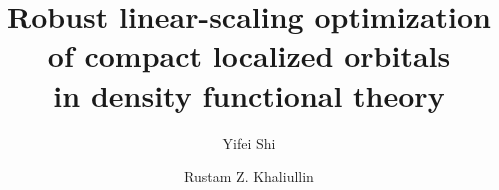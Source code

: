 \documentclass[aps,prl,twocolumn,reprint,amsmath,amssymb]{revtex4-1}
\begin{document}
\newcommand{\Ang}{\ensuremath{\mathring{\text{A}}}}
\newcommand{\ltwid}{\mathrel{\raise.3ex\hbox{$<$\kern-.75em\lower1ex\hbox{$\sim$}}}}
\newcommand{\gtwid}{\mathrel{\raise.3ex\hbox{$>$\kern-.75em\lower1ex\hbox{$\sim$}}}}
\newcommand{\ket}[1]{\ensuremath{\vert #1 \rangle}}
\newcommand{\bra}[1]{\ensuremath{\langle #1 \vert}}
\newcommand{\braket}[2]{\ensuremath{\langle #1 \vert #2 \rangle}} %
\newcommand{\ketbra}[2]{\ensuremath{\vert #1 \rangle \langle #2 \vert}} %
\newcommand{\op}[1]{\ensuremath{\hat{#1}}} %
\newcommand{\sill}{\psi}
\newcommand{\trace}{{\rm Tr}}
\newcommand{\ntilde}{\tilde{n}}
\newcommand{\stilde}{\tilde{s}}
\newcommand{\atilde}{\tilde{\alpha}}
\newcommand{\new}{\color{red}}
\newcommand{\old}{\color{black}}
\newcommand{\bea}{\begin{eqnarray}}
\newcommand{\eea}{\end{eqnarray}}
\newcommand{\br}{\ensuremath{\mathbf{r}}}
\def\nn{\nonumber\\}



\title{Robust linear-scaling optimization of compact localized orbitals\\
in density functional theory}

\author{Yifei Shi}
\author{Rustam Z. Khaliullin}

\end{document}
